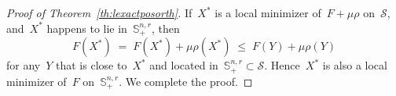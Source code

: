 \documentclass[11pt,a4paper]{article}  %
\theoremstyle{definition}
\newcommand{\sset}{\mathcal{S}}
\newcommand{\res}{\rho}
\newcommand{\pen}{\res}
\newcommand{\penpar}{\mu}
\newcommand{\col}{r}
\newcommand{\stf}[1]{\mathbb{S}^{#1}}
\begin{document}
\begin{proof}[Proof of Theorem~\ref{th:lexactposorth}]
    If~$X^*$ is a local minimizer of~$F+ \penpar \pen$ on~$\sset$, and~$X^*$
    happens to lie in~$\stf{n, \col}_+$, then
    \[
    F(X^*)\;=\;F(X^*) + \penpar \pen(X^*) \;\le\;   F(Y)+\penpar \pen(Y)
\]
    for any~$Y$ that is close to~$X^*$ and
    located in~$\stf{n, \col}_+\subset\sset$.
    Hence~$X^*$ is also a local minimizer of~$F$ on~$\stf{n,\col}_+$.
    We complete the proof.
\end{proof}



\end{document}
